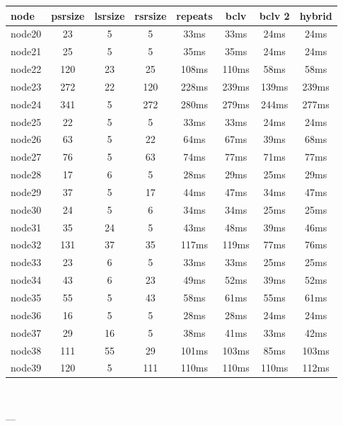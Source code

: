 \begin{tabular}{|l|c|c|c|c|c|c|c|}
\hline node & psrsize & lsrsize & rsrsize   & repeats & bclv & bclv 2 & hybrid\\
    \hline node20 & 23 & 5 & 5 & 33ms & 33ms & 24ms & 24ms\\
    \hline node21 & 25 & 5 & 5 & 35ms & 35ms & 24ms & 24ms\\
    \hline node22 & 120 & 23 & 25 & 108ms & 110ms & 58ms & 58ms\\
    \hline node23 & 272 & 22 & 120 & 228ms & 239ms & 139ms & 239ms\\
    \hline node24 & 341 & 5 & 272 & 280ms & 279ms & 244ms & 277ms\\
    \hline node25 & 22 & 5 & 5 & 33ms & 33ms & 24ms & 24ms\\
    \hline node26 & 63 & 5 & 22 & 64ms & 67ms & 39ms & 68ms\\
    \hline node27 & 76 & 5 & 63 & 74ms & 77ms & 71ms & 77ms\\
    \hline node28 & 17 & 6 & 5 & 28ms & 29ms & 25ms & 29ms\\
    \hline node29 & 37 & 5 & 17 & 44ms & 47ms & 34ms & 47ms\\
    \hline node30 & 24 & 5 & 6 & 34ms & 34ms & 25ms & 25ms\\
    \hline node31 & 35 & 24 & 5 & 43ms & 48ms & 39ms & 46ms\\
    \hline node32 & 131 & 37 & 35 & 117ms & 119ms & 77ms & 76ms\\
    \hline node33 & 23 & 6 & 5 & 33ms & 33ms & 25ms & 25ms\\
    \hline node34 & 43 & 6 & 23 & 49ms & 52ms & 39ms & 52ms\\
    \hline node35 & 55 & 5 & 43 & 58ms & 61ms & 55ms & 61ms\\
    \hline node36 & 16 & 5 & 5 & 28ms & 28ms & 24ms & 24ms\\
    \hline node37 & 29 & 16 & 5 & 38ms & 41ms & 33ms & 42ms\\
    \hline node38 & 111 & 55 & 29 & 101ms & 103ms & 85ms & 103ms\\
    \hline node39 & 120 & 5 & 111 & 110ms & 110ms & 110ms & 112ms\\

\hline
\end{tabular} \

---



